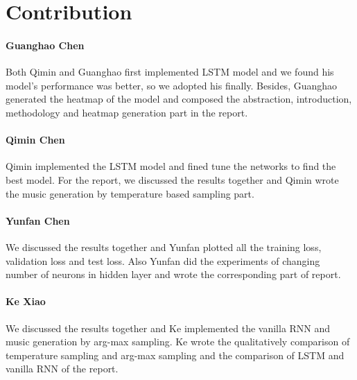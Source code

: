 \documentclass{article}
\begin{document}
\section{Contribution}
\paragraph{Guanghao Chen} Both Qimin and Guanghao first implemented LSTM model and we found his model's performance was better, so we adopted his finally. Besides, Guanghao generated the heatmap of the model and composed the abstraction, introduction, methodology and heatmap generation part in the report.

\paragraph{Qimin Chen} Qimin implemented the LSTM model and fined tune the networks to find the best model. For the report, we discussed the results together and Qimin wrote the music generation by temperature based sampling part.

\paragraph{Yunfan Chen} We discussed the results together and Yunfan plotted all the training loss, validation loss and test loss. Also Yunfan did the experiments of changing number of neurons in hidden layer and wrote the corresponding part of report.

\paragraph{Ke Xiao} We discussed the results together and Ke implemented the vanilla RNN and music generation by arg-max sampling. Ke wrote the qualitatively comparison of temperature sampling and arg-max sampling and the comparison of LSTM and vanilla RNN of the report.
\end{document}
